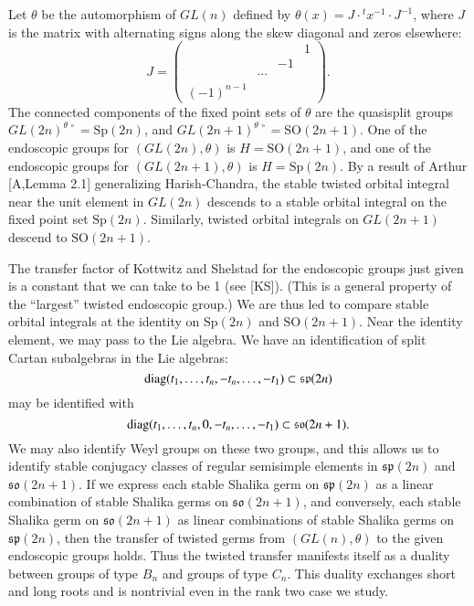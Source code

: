 \documentclass{amsart}
\newcommand\diag{\hbox{diag}}
\newcommand\so{{\mathfrak s\mathfrak o}}
\newcommand\fsp{{\mathfrak s\mathfrak p}}
\begin{document}
Let $\theta$ be the automorphism of $GL(n)$ defined by
$\theta(x) = J\cdot {}^t{x}^{-1}\cdot J^{-1}$, where $J$ is the matrix
with alternating signs along the skew diagonal and zeros
elsewhere:
$$J=\begin{pmatrix} &&& 1\\ &&-1&\\ &\cdots &&\\ (-1)^{n-1}&&&\end{pmatrix}.
$$
The connected components of the fixed point sets of $\theta$
 are the quasisplit groups $GL(2n)^{\theta\,\circ} = \text{Sp}(2n)$,
and $GL(2n+1)^{\theta\,\circ} = \text{SO}(2n+1)$.  
One of the endoscopic groups for
$(GL(2n),\theta)$ is $H= \text{SO}(2n+1)$, and one of the endoscopic groups
for $(GL(2n+1),\theta)$ is $H=\text{Sp}(2n)$.  By a result of 
Arthur [A,Lemma 2.1]
generalizing Harish-Chandra, the stable twisted
orbital integral near the unit element in $GL(2n)$ descends to a
stable orbital integral on the fixed point set $\text{Sp}(2n)$.  Similarly,
twisted orbital integrals on $GL(2n+1)$ descend to $\text{SO}(2n+1)$.

The transfer factor of Kottwitz and Shelstad for the endoscopic groups
just given is a constant that we can take to be 1 (see [KS]). 
(This is a general property of the ``largest'' twisted
endoscopic group.)
We are thus led
to compare stable orbital integrals at the identity on $\text{Sp}(2n)$ and
$\text{SO}(2n+1)$.  Near the identity element, we may pass to the Lie
algebra.  We have an identification of split Cartan subalgebras
in the Lie algebras:
$$\diag(t_1,\ldots, t_n,-t_n,\ldots,-t_1)\subset \fsp(2n)$$
may be identified with 
$$\diag(t_1,\ldots, t_n,0,-t_n,\ldots,-t_1)\subset \so(2n+1).$$
We may also identify Weyl groups on these two groups, and this allows
us to identify stable conjugacy classes of regular semisimple elements
in $\fsp(2n)$ and $\so(2n+1)$.
If we express each stable Shalika germ on $\fsp(2n)$ as a linear
combination of stable Shalika germs on $\so(2n+1)$, and conversely,
each stable Shalika germ on $\so(2n+1)$ as linear combinations of
stable Shalika germs on $\fsp(2n)$, then the transfer of twisted
germs
from $(GL(n),\theta)$ to the given endoscopic groups holds.
Thus the twisted transfer manifests itself as a duality between
groups of type $B_n$ and groups of type $C_n$.  This
duality exchanges short and long roots and is 
nontrivial even in the rank two case we study.
\end{document}

